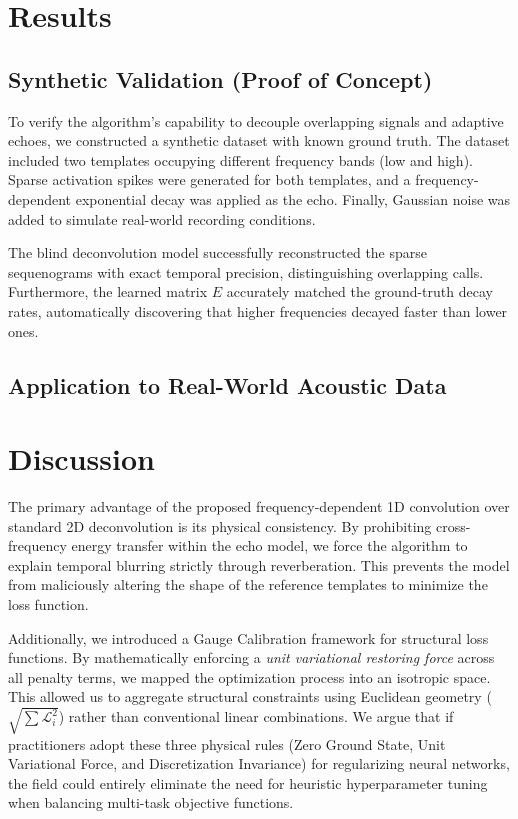 \documentclass[11pt,a4paper]{article}
\begin{document}
\section{Results}

\subsection{Synthetic Validation (Proof of Concept)}
To verify the algorithm's capability to decouple overlapping signals and adaptive echoes, we constructed a synthetic dataset with known ground truth. The dataset included two templates occupying different frequency bands (low and high). Sparse activation spikes were generated for both templates, and a frequency-dependent exponential decay was applied as the echo. Finally, Gaussian noise was added to simulate real-world recording conditions.

The blind deconvolution model successfully reconstructed the sparse sequenograms with exact temporal precision, distinguishing overlapping calls. Furthermore, the learned matrix $E$ accurately matched the ground-truth decay rates, automatically discovering that higher frequencies decayed faster than lower ones. 


\subsection{Application to Real-World Acoustic Data}

\section{Discussion}
The primary advantage of the proposed frequency-dependent 1D convolution over standard 2D deconvolution is its physical consistency. By prohibiting cross-frequency energy transfer within the echo model, we force the algorithm to explain temporal blurring strictly through reverberation. This prevents the model from maliciously altering the shape of the reference templates to minimize the loss function. 

Additionally, we introduced a Gauge Calibration framework for structural loss functions. By mathematically enforcing a \textit{unit variational restoring force} across all penalty terms, we mapped the optimization process into an isotropic space. This allowed us to aggregate structural constraints using Euclidean geometry ($\sqrt{\sum \mathcal{L}_i^2}$) rather than conventional linear combinations. We argue that if practitioners adopt these three physical rules (Zero Ground State, Unit Variational Force, and Discretization Invariance) for regularizing neural networks, the field could entirely eliminate the need for heuristic hyperparameter tuning when balancing multi-task objective functions.
\end{document}
